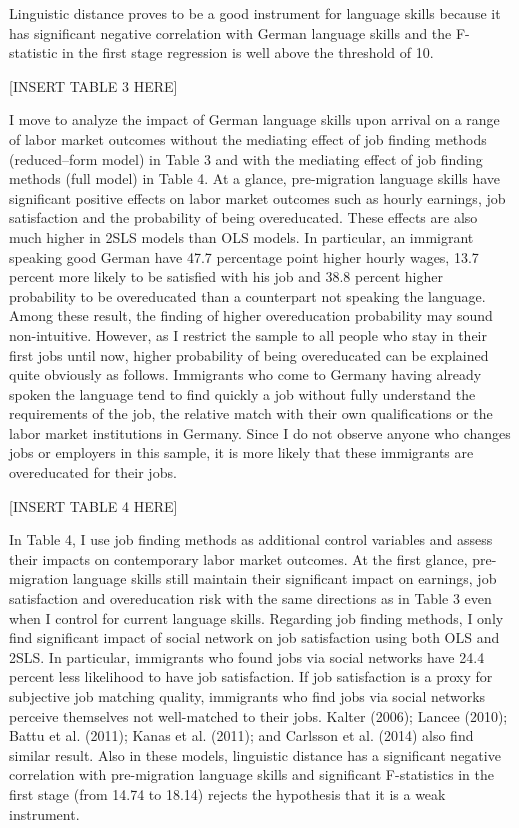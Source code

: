 \documentclass[12pt,a4paper]{article}
\begin{document}
Linguistic distance proves to be a good instrument for language skills because it has significant negative correlation with German language skills and the F-statistic in the first stage regression is well above the threshold of 10.

\begin{center}
[INSERT TABLE 3 HERE]
\end{center}

I move to analyze the impact of German language skills upon arrival on a range of labor market outcomes without the mediating effect of job finding methods (reduced--form model) in Table 3 and with the mediating effect of job finding methods (full model) in Table 4. At a glance, pre-migration language skills have significant positive effects on labor market outcomes such as hourly earnings, job satisfaction and the probability of being overeducated. These effects are also much higher in 2SLS models than OLS models. In particular, an immigrant speaking good German have 47.7 percentage point higher hourly wages, 13.7 percent more likely to be satisfied with his job and 38.8 percent higher probability to be overeducated than a counterpart not speaking the language. Among these result, the finding of higher overeducation probability may sound non-intuitive. However, as I restrict the sample to all people who stay in their first jobs until now, higher probability of being overeducated can be explained quite obviously as follows. Immigrants who come to Germany having already spoken the language tend to find quickly a job without fully understand the requirements of the job, the relative match with their own qualifications or the labor market institutions in Germany. Since I do not observe anyone who changes jobs or employers in this sample, it is more likely that these immigrants are overeducated for their jobs.

\begin{center}
[INSERT TABLE 4 HERE]
\end{center}

In Table 4, I use job finding methods as additional control variables and assess their impacts on contemporary labor market outcomes. At the first glance, pre-migration language skills still maintain their significant impact on earnings, job satisfaction and overeducation risk with the same directions as in Table 3 even when I control for current language skills. Regarding job finding methods, I only find significant impact of social network on job satisfaction using both OLS and 2SLS. In particular, immigrants who found jobs via social networks have 24.4 percent less likelihood to have job satisfaction. If job satisfaction is a proxy for subjective job matching quality, immigrants who find jobs via social networks perceive themselves not well-matched to their jobs. Kalter (2006); Lancee (2010); Battu et al. (2011); Kanas et al. (2011); and Carlsson et al. (2014) also find similar result. Also in these models, linguistic distance has a significant negative correlation with pre-migration language skills and significant F-statistics in the first stage (from 14.74 to 18.14) rejects the hypothesis that it is a weak instrument.
\end{document}
